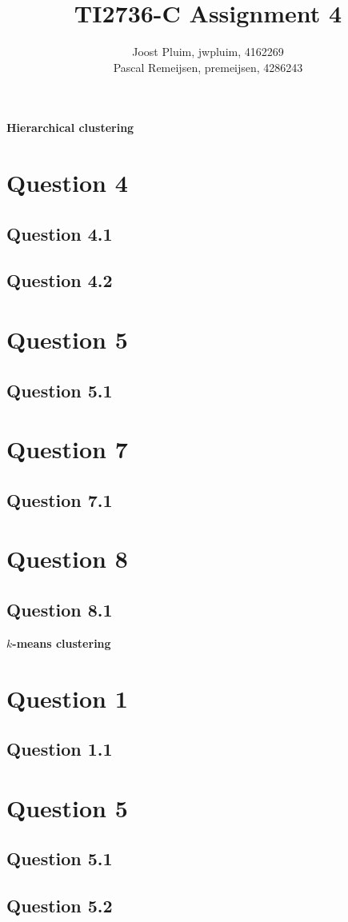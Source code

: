 \documentclass[11pt,twoside,a4paper]{article}
\title{TI2736-C Assignment 4}
\author{
	Joost Pluim, jwpluim, 4162269 \\
	Pascal Remeijsen, premeijsen, 4286243
}
\begin{document}
\maketitle
\clearpage

\textbf{Hierarchical clustering}

\section{Question 4}

	\subsection{Question 4.1}
	
	\subsection{Question 4.2}
	
\section{Question 5}

	\subsection{Question 5.1}
	
\section{Question 7}

	\subsection{Question 7.1}
	
\section{Question 8}

	\subsection{Question 8.1}
	

\textbf{$k$-means clustering}

\section{Question 1}

	\subsection{Question 1.1}
	
\section{Question 5}

	\subsection{Question 5.1}
	
	\subsection{Question 5.2}
		
	
\begin{thebibliography}{9}
\end{thebibliography}
\end{document}
